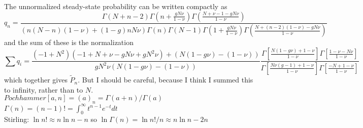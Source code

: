 The unnormalized steady-state probability can be written compactly as%
\begin{equation*}
q_n = \frac{ \Gamma(N+n-2) \Gamma\left(n+\frac{g N\nu}{1-\nu}\right) \Gamma\left(\frac{N+\nu-1-g N\nu}{1-\nu}\right) }{ (n(N-n)(1-\nu)+(1-g)n N\nu) \Gamma(n) \Gamma(N-1) \Gamma\left(1+\frac{g N\nu}{1-\nu}\right) \Gamma\left(\frac{N+(n-2)(1-\nu)-g N\nu}{1-\nu}\right)}
\end{equation*}
and the sum of these is the normalization
\begin{equation*}
\sum q_i = \frac{(-1 + N^2) (-1 + N + \nu - g N \nu + g N^2 \nu) + (N (1 - g \nu) - (1 - \nu))}{g N^2 \nu (N (1 - g \nu) - (1 - \nu))}
 \frac{\Gamma[\frac{N(1-g\nu) + 1-\nu}{1-\nu}]\Gamma[\frac{1 - \nu - N\nu}{1-\nu}]}{\Gamma[\frac{N\nu(g-1)+1-\nu}{1-\nu}]\Gamma[\frac{-N+1-\nu}{1-\nu}]}
\end{equation*}
which together gives $\widetilde{P}_n$. 
But I should be careful, because I think I summed this to infinity, rather than to $N$. \\
$Pochhammer[a,n] = (a)_n = \Gamma(a+n)/\Gamma(a)$ \\
$\Gamma(n) = (n-1)! = \int_0^\infty t^{n-1}e^{-t}dt$ \\
Stirling: $\ln n! \approx n \ln n - n$ so $\ln \Gamma(n) = \ln n!/n \approx n\ln n - 2n$ \\
